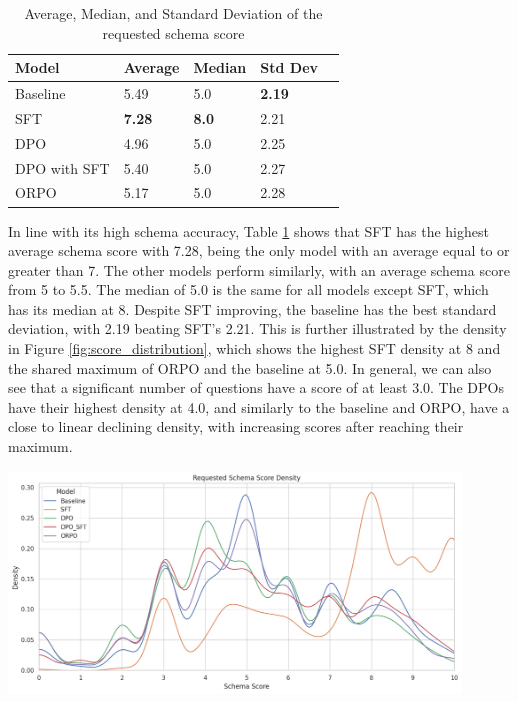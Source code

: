 \documentclass[11pt]{article}
\begin{document}
\begin{table} [H]
    \centering
    \begin{tabular}{p{1.4cm}llll}
        \hline
        \textbf{Model} & \textbf{Average} &  \textbf{Median} & \textbf{Std Dev}\\
        \hline
        Baseline     &	5.49 &	5.0 &	\textbf{2.19} \\
        SFT          &	\textbf{7.28} &	\textbf{8.0} &	2.21 \\
        DPO          &	4.96 &	5.0 &	2.25 \\
        DPO with SFT &	5.40 &	5.0 &	2.27 \\
        ORPO &  5.17 &	5.0 &	2.28 \\
        \hline
    \end{tabular}
    \caption{Average, Median, and Standard Deviation of the requested schema score}
    \label{tab: average}
\end{table}
In line with its high schema accuracy, Table \ref{tab: average} shows that SFT has the highest average schema score with 7.28, being the only model with an average equal to or greater than 7. The other models perform similarly, with an average schema score from 5 to 5.5. The median of 5.0 is the same for all models except SFT, which has its median at 8. Despite SFT improving, the baseline has the best standard deviation, with 2.19 beating SFT's 2.21.  This is further illustrated by the density in Figure \ref{fig:score_distribution}, which shows the highest SFT density at 8 and the shared maximum of ORPO and the baseline at 5.0. In general, we can also see that a significant number of questions have a score of at least 3.0. The DPOs have their highest density at 4.0, and similarly to the baseline and ORPO, have a close to linear declining density, with increasing scores after reaching their maximum.
\newpage
\begin{strip}
    \centering
    \includegraphics[width=0.9\textwidth]{images/density.png}
    \label{fig:score_distribution}
\end{strip}
\end{document}
